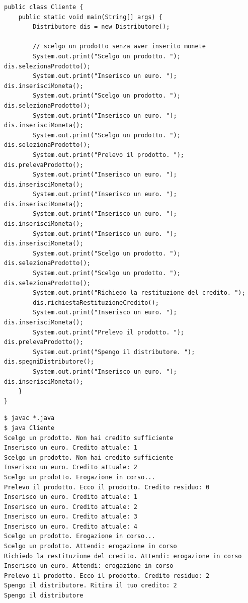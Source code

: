 \begin{lstlisting}[style=java, name=Cliente.java]
public class Cliente {
    public static void main(String[] args) {
        Distributore dis = new Distributore();

        // scelgo un prodotto senza aver inserito monete
        System.out.print("Scelgo un prodotto. "); dis.selezionaProdotto();
        System.out.print("Inserisco un euro. "); dis.inserisciMoneta();
        System.out.print("Scelgo un prodotto. "); dis.selezionaProdotto();
        System.out.print("Inserisco un euro. "); dis.inserisciMoneta();
        System.out.print("Scelgo un prodotto. "); dis.selezionaProdotto();
        System.out.print("Prelevo il prodotto. "); dis.prelevaProdotto();
        System.out.print("Inserisco un euro. "); dis.inserisciMoneta();
        System.out.print("Inserisco un euro. "); dis.inserisciMoneta();
        System.out.print("Inserisco un euro. "); dis.inserisciMoneta();
        System.out.print("Inserisco un euro. "); dis.inserisciMoneta();
        System.out.print("Scelgo un prodotto. "); dis.selezionaProdotto();
        System.out.print("Scelgo un prodotto. "); dis.selezionaProdotto();
        System.out.print("Richiedo la restituzione del credito. ");
        dis.richiestaRestituzioneCredito();
        System.out.print("Inserisco un euro. "); dis.inserisciMoneta();
        System.out.print("Prelevo il prodotto. "); dis.prelevaProdotto();
        System.out.print("Spengo il distributore. "); dis.spegniDistributore();
        System.out.print("Inserisco un euro. "); dis.inserisciMoneta();
    }
}
\end{lstlisting}

\begin{lstlisting}[style=shell, name=Terminale]
$ javac *.java
$ java Cliente
Scelgo un prodotto. Non hai credito sufficiente
Inserisco un euro. Credito attuale: 1
Scelgo un prodotto. Non hai credito sufficiente
Inserisco un euro. Credito attuale: 2
Scelgo un prodotto. Erogazione in corso...
Prelevo il prodotto. Ecco il prodotto. Credito residuo: 0
Inserisco un euro. Credito attuale: 1
Inserisco un euro. Credito attuale: 2
Inserisco un euro. Credito attuale: 3
Inserisco un euro. Credito attuale: 4
Scelgo un prodotto. Erogazione in corso...
Scelgo un prodotto. Attendi: erogazione in corso
Richiedo la restituzione del credito. Attendi: erogazione in corso
Inserisco un euro. Attendi: erogazione in corso
Prelevo il prodotto. Ecco il prodotto. Credito residuo: 2
Spengo il distributore. Ritira il tuo credito: 2
Spengo il distributore
\end{lstlisting}

